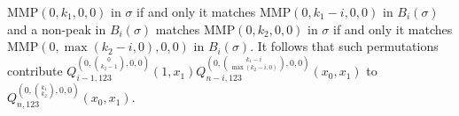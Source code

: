 \documentclass[
final,nomarks
]{dmtcs-episciences}
\newcommand{\Qmzn}[3]{Q_{#3,123}^{(0,\binom{#1}{#2},0,0)}(x_0,x_1)}
\newcommand{\Qmznx}[4]{Q_{#3,123}^{(0,\binom{#1}{#2},0,0)}(#4)}
\newcommand{\MMP}{\mathrm{MMP}}
\begin{document}
\begin{enumerate}[{\bf Case }\bf 1.]
	\begin{math}\MMP(0,k_1,0,0)\end{math} in \begin{math}\sigma\end{math} if and only it matches \begin{math}\MMP(0,k_1-i,0,0)\end{math} in \begin{math}B_i(\sigma)\end{math} 
	and a non-peak in \begin{math}B_i(\sigma)\end{math} matches 
	\begin{math}\MMP(0,k_2,0,0)\end{math} in \begin{math}\sigma\end{math} if and only it matches \begin{math}\MMP(0,\max(k_2-i,0),0,0)\end{math} in \begin{math}B_i(\sigma)\end{math}.
	It follows that such permutations contribute 
	\begin{math}\Qmznx{0}{k_2-1}{i-1}{1,x_1}\Qmzn{k_1-i}{\max(k_2-i,0)}{n-i}\end{math} to 
	\begin{math}\Qmzn{k_1}{k_2}{n}\end{math}.
	

\end{enumerate}
\end{document}
